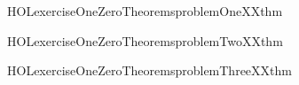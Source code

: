\newcommand{\HOLexerciseOneZeroDate}{26 February 2019}
\newcommand{\HOLexerciseOneZeroTime}{20:51}
\begin{SaveVerbatim}{HOLexerciseOneZeroTheoremsproblemOneXXthm}
\HOLTokenTurnstile{}  
\end{SaveVerbatim}
\newcommand{\HOLexerciseOneZeroTheoremsproblemOneXXthm}{\UseVerbatim{HOLexerciseOneZeroTheoremsproblemOneXXthm}}
\begin{SaveVerbatim}{HOLexerciseOneZeroTheoremsproblemTwoXXthm}
\HOLTokenTurnstile{}  \HOLSymConst{\HOLTokenImp{}} \HOLSymConst{\HOLTokenNeg{}}
\end{SaveVerbatim}
\newcommand{\HOLexerciseOneZeroTheoremsproblemTwoXXthm}{\UseVerbatim{HOLexerciseOneZeroTheoremsproblemTwoXXthm}}
\begin{SaveVerbatim}{HOLexerciseOneZeroTheoremsproblemThreeXXthm}
\HOLTokenTurnstile{}  \HOLSymConst{\HOLTokenDisj{}} 
\end{SaveVerbatim}
\newcommand{\HOLexerciseOneZeroTheoremsproblemThreeXXthm}{\UseVerbatim{HOLexerciseOneZeroTheoremsproblemThreeXXthm}}
\newcommand{\HOLexerciseOneZeroTheorems}{
\HOLThmTag{exercise10}{problem1_thm}\HOLexerciseOneZeroTheoremsproblemOneXXthm
\HOLThmTag{exercise10}{problem2_thm}\HOLexerciseOneZeroTheoremsproblemTwoXXthm
\HOLThmTag{exercise10}{problem3_thm}\HOLexerciseOneZeroTheoremsproblemThreeXXthm
}
